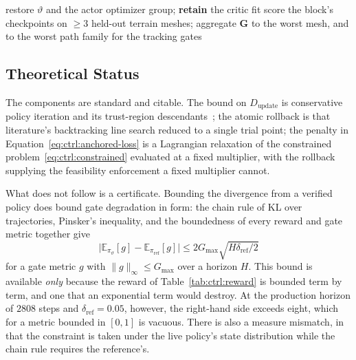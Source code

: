 \begin{algorithm}[!ht]
{{{        restore $\vartheta$ and the actor optimizer group; \textbf{retain}
          the critic fit \label{alg:line:reject}
      }
    }
    score the block's checkpoints on $\ge 3$ held-out terrain meshes;
      aggregate $\bm{G}$ to the worst mesh, and to the worst path family for
      the tracking gates\;
  }
  \caption{Reference-anchored PPO for the \ppoROM{} verge policy. The teacher
  appears only in layer~1 and the reference only as a divergence target: at
  every step of layer~3 the plant is driven by $\pi_{\vartheta}$ alone.}
  \label{alg:ctrl:anchored}
\end{algorithm}

\subsection{Theoretical Status}

The components are standard and citable. The bound on $D_{\mathrm{update}}$ is
conservative policy iteration and its trust-region
descendants~\cite{kakade2002approximately,schulman2015trust}; the atomic
rollback is that literature's backtracking line search reduced to a single
trial point; the penalty in
Equation~\eqref{eq:ctrl:anchored-loss} is a Lagrangian relaxation of the
constrained problem~\eqref{eq:ctrl:constrained} evaluated at a fixed multiplier,
with the rollback supplying the feasibility enforcement a fixed multiplier
cannot.

What does not follow is a certificate. Bounding the divergence from a verified
policy does bound gate degradation in form: the chain rule of KL over
trajectories, Pinsker's inequality, and the boundedness of every reward and
gate metric together give
%
\begin{equation}
  \label{eq:ctrl:pinsker}
  \bigl| \mathbb{E}_{\pi_\vartheta}[g] - \mathbb{E}_{\pi_{\mathrm{ref}}}[g] \bigr|
  \le 2 G_{\max} \sqrt{H \delta_{\mathrm{ref}} / 2}
\end{equation}
%
for a gate metric $g$ with $\|g\|_\infty \le G_{\max}$ over a horizon $H$.
This bound is available \emph{only} because the reward of
Table~\ref{tab:ctrl:reward} is bounded term by term, and one that an
exponential term would destroy. At the production horizon of $2808$ steps and
$\delta_{\mathrm{ref}} = 0.05$, however, the right-hand side exceeds eight,
which for a metric bounded in $[0,1]$ is vacuous. There is also a measure
mismatch, in that the constraint is taken under the live policy's state
distribution while the chain rule requires the reference's.

